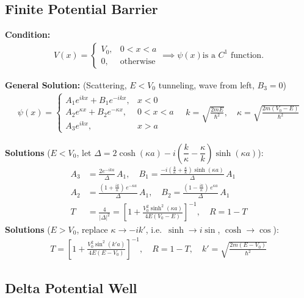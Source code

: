 \documentclass[12pt]{article}
\begin{document}
\subsection{Finite Potential Barrier }

\textbf{Condition: }
\begin{align}
    V(x) = \begin{cases}
    V_0, & 0 < x < a \\
    0, & \text{otherwise}
\end{cases} \implies \psi(x) \text{is a $C^1$ function.}
\end{align}

\textbf{General Solution: } (Scattering, $E < V_0$ tunneling, wave from left, $B_3 = 0$)
\begin{align}
    \psi(x) = \begin{cases}
    A_1 e^{ikx} + B_1 e^{-ikx}, & x < 0 \\
    A_2 e^{\kappa x} + B_2 e^{-\kappa x}, & 0 < x < a \\
    A_3 e^{ikx}, & x > a
\end{cases} \quad k = \sqrt{\frac{2mE}{\hbar^2}}, \quad \kappa = \sqrt{\frac{2m(V_0-E)}{\hbar^2}}
\end{align}

\textbf{Solutions} ($E < V_0$, let $\Delta = 2\cosh(\kappa a) - i\!\left(\dfrac{k}{\kappa}-\dfrac{\kappa}{k}\right)\sinh(\kappa a)$):
\begin{align}
    A_3 &= \frac{2e^{-ika}}{\Delta}\,A_1, \quad
    B_1 = \frac{-i\!\left(\tfrac{k}{\kappa}+\tfrac{\kappa}{k}\right)\sinh(\kappa a)}{\Delta}\,A_1 \\
    A_2 &= \frac{(1+\tfrac{ik}{\kappa})\,e^{-\kappa a}}{\Delta}\,A_1, \quad
    B_2 = \frac{(1-\tfrac{ik}{\kappa})\,e^{\kappa a}}{\Delta}\,A_1 \\
    T &= \frac{4}{|\Delta|^2} = \left[1 + \frac{V_0^2 \sinh^2(\kappa a)}{4E(V_0-E)}\right]^{-1}, \quad R = 1-T
\end{align}
\textbf{Solutions} ($E > V_0$, replace $\kappa \to -ik'$, i.e.\ $\sinh \to i\sin$, $\cosh \to \cos$):
\begin{align}
    T = \left[1 + \frac{V_0^2 \sin^2(k' a)}{4E(E-V_0)}\right]^{-1}, \quad R = 1-T, \quad k' = \sqrt{\frac{2m(E-V_0)}{\hbar^2}}
\end{align}

\subsection{Delta Potential Well}
\end{document}
